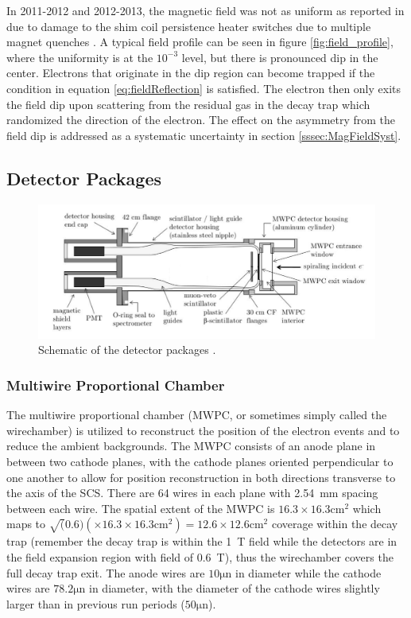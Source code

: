 In 2011-2012 and 2012-2013, the magnetic field was not as uniform as reported in 
\cite{plaster2008solenoidal} due to damage to the shim coil persistence heater switches
due to multiple magnet quenches \cite{plaster2012}. A typical field profile can be seen
in figure \ref{fig:field_profile}, where the uniformity is at the $10^{-3}$ level, but there is
pronounced dip in the center. Electrons
that originate in the dip region can become trapped if the condition in equation
\ref{eq:fieldReflection} is satisfied. The electron then only exits the field dip
upon scattering from the residual gas in the decay trap which randomized the direction
of the electron. The effect
on the asymmetry from the field
dip is addressed as a systematic
uncertainty in section \ref{sssec:MagFieldSyst}.


\subsection{Detector Packages}

\begin{figure}[h]
  \centering
  \includegraphics[scale=0.6]{2-UCNAExperiment/detector_setup.pdf} 
  \caption{Schematic of the detector packages \cite{plaster2012}.}
  \label{fig:detectors}
\end{figure}

\subsubsection{Multiwire Proportional Chamber}

The multiwire proportional chamber (MWPC, or sometimes simply called the wirechamber)
\cite{ito2007,plaster2012} is
utilized to reconstruct the position of the electron events and to reduce the ambient
backgrounds. The MWPC consists of an anode plane in between two cathode planes, with the cathode
planes oriented perpendicular to one another to allow for position reconstruction in both directions
transverse to the axis of the SCS. There are
64 wires in each plane with 2.54~mm spacing between each wire. The spatial extent of the
MWPC is $16.3 \times 16.3\mathrm{ cm}^2$ which maps to
$\sqrt(0.6) (\times 16.3 \times 16.3\mathrm{ cm}^2) = 12.6 \times 12.6\mathrm{ cm}^2$ coverage
within the decay trap (remember the decay trap is within the 1~T field while the detectors
are in the field expansion region with field of 0.6~T), thus the wirechamber covers the full
decay trap exit. The anode wires are $10\mathrm{ \mu{n}}$ in diameter while the cathode
wires are $78.2\mathrm{ \mu{n}}$ in diameter, with the diameter of the cathode wires slightly
larger than in previous run periods ($50\mathrm{ \mu{n}}$).


